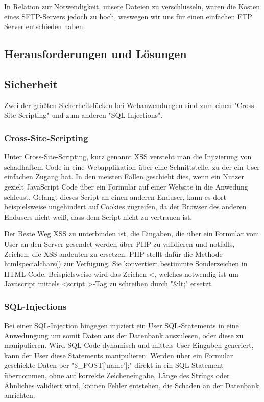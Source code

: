 {    In Relation zur Notwendigkeit, unsere Dateien zu verschlüsseln, waren die Kosten eines SFTP-Servers jedoch zu hoch, weswegen wir uns für einen einfachen FTP Server entschieden haben.

  \subsection{Herausforderungen und Lösungen}

    \subsection*{Sicherheit}
    Zwei der größten Sicherheitslücken bei Webanwendungen sind zum einen {"Cross-Site-Scripting"\cite{xss}} und zum anderen {"SQL-Injections"\cite{sqlinjections}}.

      \subsubsection*{Cross-Site-Scripting}
      Unter Cross-Site-Scripting, kurz genannt XSS versteht man die Injizierung von schadhaftem Code in eine Webapplikation über eine Schnittstelle, zu der ein User
      einfachen Zugang hat. In den meisten Fällen geschieht dies, wenn ein Nutzer gezielt JavaScript Code über ein Formular auf einer Website in die Anwedung schleust.
      Gelangt dieses Script an einen anderen Enduser, kann es dort beispielsweise ungehindert auf Cookies zugreifen, da der Browser des anderen Endusers nicht weiß,
      dass dem Script nicht zu vertrauen ist.

      Der Beste Weg XSS zu unterbinden ist, die Eingaben, die über ein Formular vom User an den Server gesendet werden über PHP zu validieren und notfalls, Zeichen, die
      XSS andeuten zu ersetzen. PHP stellt dafür die Methode htmlspecialchars() zur Verfügung. Sie konvertiert bestimmte Sonderzeichen in HTML-Code. Beispielsweise wird
      das Zeichen \textless , welches notwendig ist um Javascript mittels \textless script \textgreater-Tag zu schreiben durch "\&lt;" ersetzt.

      \subsubsection*{SQL-Injections}
      Bei einer SQL-Injection hingegen injiziert ein User SQL-Statements in eine Anwedungung um somit Daten aus der Datenbank auszulesen, oder diese zu manipulieren.
      Wird SQL Code dynamisch und mittels User Eingaben generiert, kann der User diese Statements manipulieren. Werden über ein Formular
      geschickte Daten per "\$\_POST['name'];" direkt in ein SQL Statement übernommen, ohne auf korrekte Zeicheneingabe, Länge des Strings oder Ähnliches validiert wird,
      können Fehler entstehen, die Schaden an der Datenbank anrichten.

}
